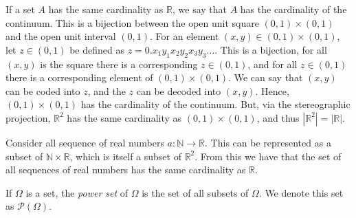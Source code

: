 \documentclass[crop=false,class=book,oneside]{standalone}
\begin{document}
        If a set $A$ has the same cardinality as $\mathbb{R}$,
        we say that $A$ has the cardinality of the
        continuum. This is a bijection between the open unit
        square $(0,1)\times(0,1)$ and the open unit interval
        $(0,1)$. For an element $(x,y)\in(0,1)\times(0,1)$,
        let $z\in(0,1)$ be defined as
        $z=0.x_{1}y_{1}x_{2}y_{2}x_{3}y_{3}\hdots$. This is
        a bijection, for all $(x,y)$ is the square there is
        a corresponding $z\in(0,1)$, and for all
        $z\in(0,1)$ there is a corresponding element of
        $(0,1)\times(0,1)$. We can say that $(x,y)$ can
        be coded into $z$, and the $z$ can be decoded into
        $(x,y)$. Hence, $(0,1)\times(0,1)$ has the cardinality
        of the continuum. But, via the stereographic projection,
        $\mathbb{R}^{2}$ has the same cardinality as
        $(0,1)\times(0,1)$, and thus
        $|\mathbb{R}^{2}|=|\mathbb{R}|$.
        \begin{example}
            Consider all sequence of real numbers
            $a:\mathbb{N}\rightarrow\mathbb{R}$. This can be
            represented as a subset of
            $\mathbb{N}\times\mathbb{R}$, which is itself
            a subset of $\mathbb{R}^{2}$. From this we have
            that the set of all sequences of real numbers has
            the same cardinality as $\mathbb{R}$.
        \end{example}
        If $\Omega$ is a set, the \textit{power set} of
        $\Omega$ is the set of all subsets of $\Omega$.
        We denote this set as $\mathcal{P}(\Omega)$.
\end{document}
